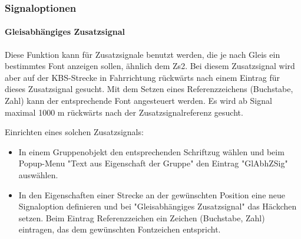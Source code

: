 \subsubsection{Signaloptionen}
\label{subsubsec.editor.gleis.gleiseigenschaften.signaloptionen}

\paragraph{Gleisabhängiges Zusatzsignal}
Diese Funktion kann für Zusatzsignale benutzt werden, die je nach Gleis ein bestimmtes Font anzeigen sollen, ähnlich dem Zs2. Bei diesem Zusatzsignal wird aber auf der KBS-Strecke in Fahrrichtung rückwärts nach einem Eintrag für dieses Zusatzsignal gesucht. Mit dem Setzen eines Referenzzeichens (Buchstabe, Zahl) kann der entsprechende Font angesteuert werden. Es wird ab Signal maximal 1000 m rückwärts nach der Zusatzsignalreferenz gesucht.

Einrichten eines solchen Zusatzsignals:
\begin{itemize}
\item
In einem Gruppenobjekt den entsprechenden Schriftzug wählen und beim Popup-Menu  "Text aus Eigenschaft der Gruppe" den Eintrag "GlAbhZSig" auswählen.
\item
In den Eigenschaften einer Strecke an der gewünschten Position eine neue Signaloption definieren und bei "Gleisabhängiges Zusatzsignal" das Häckchen setzen. Beim Eintrag Referenzzeichen ein Zeichen (Buchstabe, Zahl) eintragen, das dem gewünschten Fontzeichen entspricht.
\end{itemize}